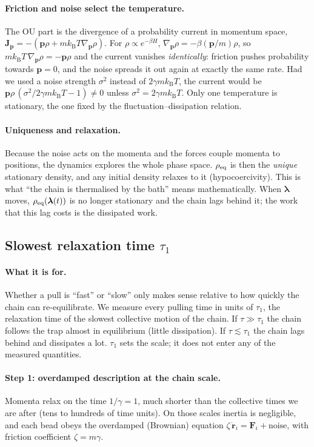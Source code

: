 \documentclass[11pt,a4paper]{article}
\newcommand{\kT}{k_{\mathrm B}T}
\newcommand{\lam}{\bm{\lambda}}
\begin{document}
\paragraph{Friction and noise select the temperature.} The OU part is the divergence of a probability
current in momentum space, $\bm J_{\bm p}=-(\bm p\rho+m\kT\nabla_{\bm p}\rho)$. For $\rho\propto e^{-\beta H}$,
$\nabla_{\bm p}\rho=-\beta(\bm p/m)\rho$, so $m\kT\,\nabla_{\bm p}\rho=-\bm p\rho$ and the current vanishes
\emph{identically}: friction pushes probability towards $\bm p=0$, and the noise spreads it out
again at exactly the same rate. Had we used a noise strength $\sigma^2$ instead of $2\gamma m\kT$,
the current would be $\bm p\rho\,(\sigma^2/2\gamma m\kT-1)\neq0$ unless $\sigma^2=2\gamma m\kT$. Only one
temperature is stationary, the one fixed by the fluctuation--dissipation relation.

\paragraph{Uniqueness and relaxation.} Because the noise acts on the momenta and the forces couple
momenta to positions, the dynamics explores the whole phase space. $\rho_{\rm eq}$ is then the
\emph{unique} stationary density, and any initial density relaxes to it (hypocoercivity). This is
what ``the chain is thermalised by the bath'' means mathematically. When $\lam$ moves, $\rho_{\rm eq}(\lam(t))$
is no longer stationary and the chain lags behind it; the work that this lag costs is the dissipated work.

\subsection{Slowest relaxation time $\tau_1$}
\label{sec:tau1}

\paragraph{What it is for.} Whether a pull is ``fast'' or ``slow'' only makes sense relative to how
quickly the chain can re-equilibrate. We measure every pulling time in units of $\tau_1$, the
relaxation time of the slowest collective motion of the chain. If $\tau\gg\tau_1$ the chain follows the
trap almost in equilibrium (little dissipation). If $\tau\lesssim\tau_1$ the chain lags behind and
dissipates a lot. $\tau_1$ sets the scale; it does not enter any of the measured quantities.

\paragraph{Step 1: overdamped description at the chain scale.} Momenta relax on the time $1/\gamma=1$,
much shorter than the collective times we are after (tens to hundreds of time units). On those scales
inertia is negligible, and each bead obeys the overdamped (Brownian) equation
$\zeta\,\dot{\bm r}_i=\bm F_i+\text{noise}$, with friction coefficient $\zeta=m\gamma$.
\end{document}
